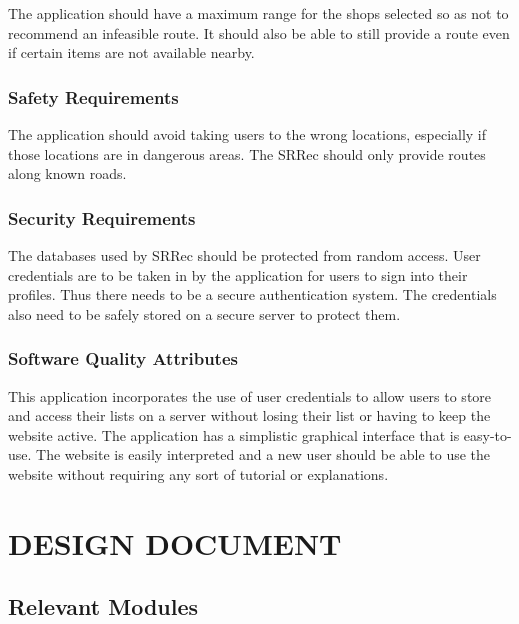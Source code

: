 \documentclass[10pt,twocolumn]{witseiepaper}
\begin{document}
		The application should have a maximum range for the shops selected so as not to recommend an infeasible route. It should also be able to still provide a route even if certain items are not available nearby.
		
		\subsubsection{Safety Requirements}
		
		The application should avoid taking users to the wrong locations, especially if those locations are in dangerous areas. The SRRec should only provide routes along known roads.
		
		\subsubsection{Security Requirements}
		
		The databases used by SRRec should be protected from random access. User credentials are to be taken in by the application for users to sign into their profiles. Thus there needs to be a secure authentication system. The credentials also need to be safely stored on a secure server to protect them.
		
		\subsubsection{Software Quality Attributes}
		
		This application incorporates the use of user credentials to allow users to store and access their lists on a 	server without losing their list or having to keep the website active. The application has a simplistic graphical interface that is easy-to-use. The website is easily interpreted and a new user should be able to use the website without requiring any sort of tutorial or explanations.

\section{DESIGN DOCUMENT}

\begin{center}
\end{center}



	\subsection{Relevant Modules}
		
\end{document}

